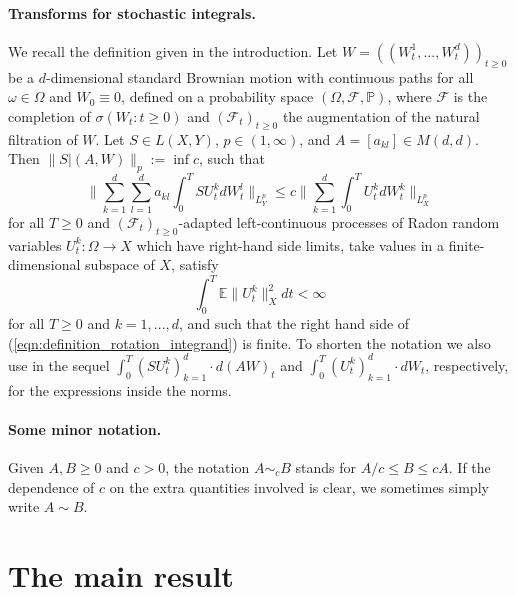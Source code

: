 \documentclass[11pt,a4paper,twoside,draft]{amsart}
\theoremstyle{definition}
\newcommand{\ftn}{\mathcal{F}}
\newcommand{\E}{\mathbb{E}}
\newcommand{\mass}{\mathbb{P}}
\newcommand{\ito}[3]{\| #1 |(#2 ,W)\|_{#3}}
\begin{document}
\paragraph{{\bf Transforms for stochastic integrals}.}
We recall the definition given in the introduction.
Let $W=((W_t^1,...,W_t^d))_{t\ge 0}$ be a $d$-dimensional
standard Brownian motion with continuous paths for all $\omega\in\Omega$
and $W_0\equiv 0$, defined on a probability space $(\Omega,\ftn,\mass)$,
where $\ftn$ is the completion of $\sigma(W_t: t\ge 0)$ and 
$(\ftn_t)_{t\ge 0}$ the augmentation of the natural filtration
of $W$. Let $S\in L(X,Y)$, $p\in (1,\infty)$, and $A=[a_{kl}]\in M(d,d)$. 
Then $\ito{S}{A}{p} := \inf c$, such that
\begin{equation}\label{eqn:definition_rotation_integrand}
       \Big \| \sum_{k=1}^d \sum_{l=1}^d a_{kl} \int_0^T SU_t^k d W_t^l 
       \Big \|_{L^p_Y}
   \le c  \Big \| \sum_{k=1}^d \int_0^T U_t^k d W_t^k
          \Big \|_{L^p_X}
\end{equation}
for all $T\ge 0$ and $(\mathcal{F}_t)_{t\ge 0}$-adapted left-continuous processes 
of Radon random variables $U_t^k:\Omega\rightarrow X$ which have right-hand side limits,
take values in a finite-dimensional subspace of $X$, satisfy
\[ \int_0^T \E\| U_t^k\|_X^2 dt < \infty \]
for all $T\ge 0$ and $k=1,...,d$, and such that the right hand side of 
(\ref{eqn:definition_rotation_integrand}) is finite.
To shorten the notation we also use in the sequel 
$\int_0^T (SU_t^k)_{k=1}^d \cdot d(AW)_t$ and
$\int_0^T (U_t^k)_{k=1}^d \cdot dW_t$, respectively, 
for the expressions inside the norms.

\bigskip
\paragraph{{\bf Some minor notation}.} Given $A,B\ge 0$ and $c>0$, the notation
$A\sim_c B$ stands for $A/c\le B \le cA$. If the dependence of $c$ on the
extra quantities involved is clear, we sometimes simply write $A\sim B.$


\section{The main result}\label{se:results}
\end{document}
